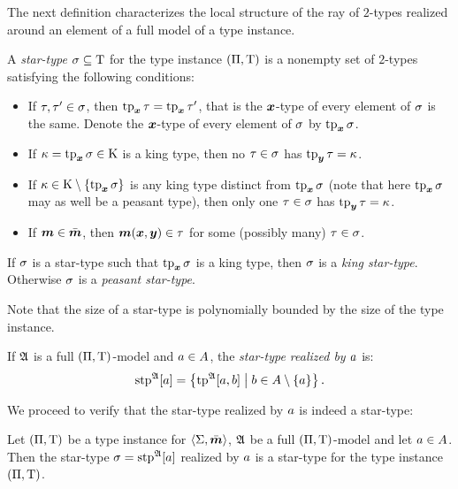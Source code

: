 The next definition characterizes the local structure of the ray of $2$-types
realized around an element of a full model of a type instance.
\begin{definition}
A \emph{star-type} $\sigma \subseteq \mathrm{T}$ for the type instance
$(\Pi,\mathrm{T})$ is a nonempty set of $2$-types satisfying the following conditions:
\begin{itemize}
  \item[\stpcond1]\label{cond:stp-1} If $\tau, {\tau'} \in \sigma$, then
  $\operatorname{tp}_{\bm{x}}\tau = \operatorname{tp}_{\bm{x}}{\tau'}$, that is the $\bm{x}$-type of every element of $\sigma$ is the same.
  Denote the $\bm{x}$-type of every element of $\sigma$ by $\operatorname{tp}_{\bm{x}}\sigma$.
  \item[\stpcond2]\label{cond:stp-2} If $\kappa = \operatorname{tp}_{\bm{x}}\sigma \in \mathrm{K}$ is a
  king type, then no $\tau\in\sigma$ has $\operatorname{tp}_{\bm{y}}\tau = \kappa$.
  \item[\stpcond3]\label{cond:stp-3} If $\kappa \in \mathrm{K} \setminus \left\{\operatorname{tp}_{\bm{x}}\sigma\right\}$
  is any king type distinct from $\operatorname{tp}_{\bm{x}}\sigma$ (note that here $\operatorname{tp}_{\bm{x}}\sigma$ may as well be a
  peasant type), then only one $\tau\in\sigma$ has $\operatorname{tp}_{\bm{y}}\tau = \kappa$.
  \item[\stpcond4]\label{cond:stp-4} If $\bm{m} \in \bar{\bm{m}}$, then $\bm{m}(\bm{x},\bm{y})
  \in \tau$ for some (possibly many) $\tau \in \sigma$.
\end{itemize}
If $\sigma$ is a star-type such that $\operatorname{tp}_{\bm{x}}\sigma$ is a king type, then $\sigma$ is
a \emph{king star-type}. Otherwise $\sigma$ is a \emph{peasant star-type}.

Note that the size of a star-type is polynomially bounded by the size of the
type instance.

If $\mathfrak{A}$ is a full $(\Pi,\mathrm{T})$-model and $a \in A$, the
\emph{star-type realized by $a$} is:
\[
  \operatorname{stp}^{\mathfrak{A}}[a] = \left\{\operatorname{tp}^{\mathfrak{A}}[a,b]\mathrel{}\middle|\mathrel{}b \in A \setminus \left\{a\right\}\right\}.
\]
\end{definition}
We proceed to verify that the star-type realized by $a$ is indeed a star-type:
\begin{remark}
Let $(\Pi,\mathrm{T})$ be a type instance for $\left\langle \mathrm{\Sigma},\bar{\bm{m}} \right\rangle$, $\mathfrak{A}$ be
a full $(\Pi,\mathrm{T})$-model and let $a \in A$. Then the star-type
$\sigma = \operatorname{stp}^{\mathfrak{A}}[a]$ realized by $a$ is a star-type for the type instance
$(\Pi,\mathrm{T})$.
\end{remark}
